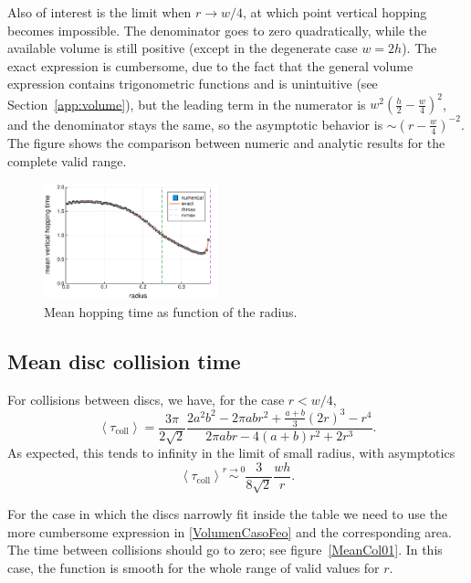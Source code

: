 \documentclass[superscriptaddress,pre,reprint,showpacs,twocolumn]{revtex4-1}
\newcommand{\mean}[1]{\left \langle #1 \right \rangle}
\begin{document}
Also of interest is the limit when $r \to w/4$, at which point vertical hopping becomes
impossible.  The denominator goes to zero quadratically, while the available volume
is still positive (except in the degenerate case $w=2h$). The exact expression
is cumbersome, due to the fact that the general volume expression contains trigonometric functions
 and is unintuitive (see Section~\ref{app:volume}),
but the leading term in the numerator is  $w^2 (\frac{h}{2} - \frac{w}{4})^2$, and the denominator
stays the same, so the asymptotic behavior is $\sim (r - \frac{w}{4})^{-2}$. The figure \label{MeanHopp01} shows the comparison between
numeric and analytic results for the complete valid range. 


\begin{figure}[h]
  \centering
  \includegraphics[width=0.45\textwidth]{./figures/VertHop01.pdf}
  \caption{Mean hopping time as function of the radius.}\label{MeanHopp01}
\end{figure}


\subsection{Mean disc collision time}

For collisions between discs, we have, for the case $r < w/4$,
\begin{equation}\label{colltau}
 \mean{\tau_\text{coll}} = 	
\frac{3 \pi}{2\sqrt{2}}
\frac {2 a^{2} b^{2}  - 2 \pi a b r^{2} + \textstyle \frac{a+b}{3}  (2r)^{3}  -  r^4}
{2\pi a b r -4(a+b)r^2+2r^3}.
\end{equation}
As expected, this tends to infinity in the limit of small radius, with asymptotics
\begin{equation}\label{colltaulim0}
\mean{\tau_\text{coll}} \overset{r \to 0}{\sim}
\frac{3}{8\sqrt{2}}\frac{wh}{r}.
\end{equation}

For the case in which the discs narrowly fit inside the table we need to
use the more cumbersome expression in \eqref{VolumenCasoFeo} and
the corresponding area. The time between collisions should go to zero; 
see figure~\ref{MeanCol01}. In this case, the function is smooth for the whole
range of valid values for $r$.
\end{document}
